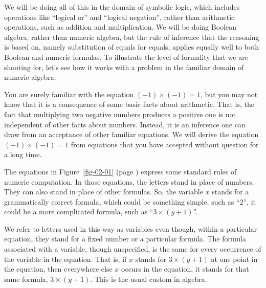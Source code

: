 We will be doing all of this in the domain of symbolic logic, which
includes operations like ``logical or'' and ``logical negation'',
rather than arithmetic operations, such as addition and
multiplication.
We will be doing Boolean algebra, rather than numeric algebra,
but the rule of inference that the reasoning is based on, namely
substitution
of equals for equals,
applies equally well to both Boolean and numeric formulas.
To illustrate the level of formality that we are shooting for,
let's see how it works with a problem
in the familiar domain of numeric algebra.

You are surely familiar with the equation $(-1)\times(-1) = 1$, but you may
not know that it is a consequence of some basic facts about
arithmetic.
That is, the fact that multiplying two
negative numbers produces a positive one
is not independent of other facts about numbers.
Instead, it is an inference one can draw
from an acceptance of other familiar equations.
We will derive the equation $(-1)\times(-1) = 1$
from equations that you have accepted without question for a long time.

The equations in Figure~\ref{fig-02-01} (page \pageref{fig-02-01})
express some standard rules of numeric computation.
In those equations, the letters stand in
place of numbers. They can also stand in place of other
formulas.
So, the variable $x$ stands for a grammatically correct formula,
which could be something simple, such as ``$2$'',
it could be a more complicated formula, such as ``$3\times(y + 1)$''.

We refer to letters used in this way as
variables even though, within a particular equation, they
stand for a fixed number or a particular formula.
The formula associated with a variable, though unspecified,
is the same for every occurrence of the variable in the equation.
That is, if $x$ stands for $3\times(y + 1)$ at one point in the
equation, then everywhere else $x$ occurs in the equation,
it stands for that same formula, $3\times(y + 1)$.
This is the usual custom in algebra.

